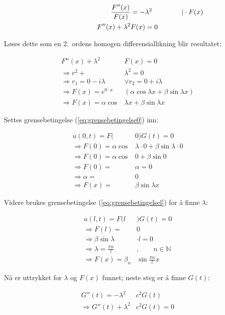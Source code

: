 \begin{align*}
	\hspace{20ex} \frac{F''(x)}{F(x)} &= - \lambda^2 \hspace{10ex} \vert \cdot F(x)\\
	F''(x) + \lambda^2&F(x) = 0
\end{align*}

Løses dette som en 2.\ ordens homogen differensiallikning blir resultatet:

\begin{align*}
	F''(x) + \lambda^2&F(x) = 0 \\ 
	\Rightarrow r^2 + &\lambda^2 = 0 \\
	\Rightarrow r_1 = 0 - i \lambda &\vee r_2 = 0 + i \lambda \\
	\Rightarrow F(x) = e^{0 \cdot x} & \left( \alpha  \cos \lambda x + \beta \sin \lambda x \right) \\
	\Rightarrow F(x) = \alpha \cos& \lambda x + \beta \sin \lambda x 
\end{align*}

Settes grensebetingelse (\ref{eq:grensebetingelse0}) inn:

\begin{align*}
	u(0 , t) = F(&0)G(t) = 0\\
	\Rightarrow F(0) = \alpha \cos&\lambda \cdot 0 + \beta \sin \lambda \cdot 0 \\
	\Rightarrow F(0) = \alpha \cos&0 + \beta \sin 0 \\
	\Rightarrow F(0) = &\alpha = 0 \\
	\Rightarrow \alpha =& 0 \\
	\Rightarrow F(x) = &\beta \sin \lambda x
\end{align*}

Videre brukes grensebetingelse (\ref{eq:grensebetingelsel}) for å finne $\lambda$:

\begin{align*}
	u(l ,t) = F(l&)G(t) = 0 \\
	\Rightarrow F(l) =& 0 \\
	\Rightarrow \beta \sin \lambda &\cdot l = 0 \\ 
	\Rightarrow \lambda = \frac{\pi n}{l}&, \qquad n \in \mathbb{N} \\
	\Rightarrow F(x) = { \beta }_n & \sin \frac{\pi n}{l} x
\end{align*}

Nå er uttrykket for $\lambda$ og $F(x)$ funnet; neste steg er å finne $G(t)$:

\begin{align*}
	G''(t) = - \lambda^2 & c^2 G(t) \\
	\Rightarrow G''(t) + \lambda^2 & c^2 G(t) = 0 
\end{align*}

